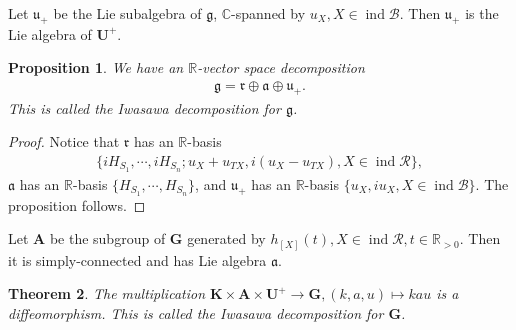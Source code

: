 \documentclass[12pt]{amsart}
\newtheorem{theorem}{Theorem}[section]
\newtheorem{proposition}[theorem]{Proposition}
\begin{document}
Let $\mathfrak{u}_+$ be the Lie subalgebra of $\mathfrak{g}$, $\mathbb{C}$-spanned by $u_X,X\in \operatorname{ind}\mathcal{B}$.
Then $\mathfrak{u}_+$ is the Lie algebra of $\mathbf{U}^+$.

\begin{proposition}
    We have an $\mathbb{R}$-vector space decomposition
    \begin{align*}
        \mathfrak{g}=\mathfrak{r}\oplus \mathfrak{a} \oplus \mathfrak{u}_+.
    \end{align*}
    This is called the Iwasawa decomposition for $\mathfrak{g}$.
\end{proposition}

\begin{proof}
    Notice that $\mathfrak{r}$ has an $\mathbb{R}$-basis
    \begin{align*}
         \{iH_{S_1},\cdots,iH_{S_n};u_X+u_{TX},i(u_X-u_{TX}),X\in \operatorname{ind}\mathcal{R}\},
    \end{align*}
    $\mathfrak{a}$ has an $\mathbb{R}$-basis $\{H_{S_1},\cdots,H_{S_n}\}$, and $\mathfrak{u}_+$ has an $\mathbb{R}$-basis $\{u_X,iu_X,X\in \operatorname{ind}\mathcal{B}\}$.
     The proposition follows.
\end{proof}

Let $\mathbf{A}$ be the subgroup of $\mathbf{G}$ generated by $h_{[X]}(t),X\in\operatorname{ind}\mathcal{R},t\in \mathbb{R}_{>0}$.
Then it is simply-connected and has Lie algebra $\mathfrak{a}$.

\begin{theorem}
    The multiplication $\mathbf{K}\times \mathbf{A}\times \mathbf{U}^+ \rightarrow \mathbf{G}, (k,a,u)\mapsto kau$ is a diffeomorphism.
    This is called the Iwasawa decomposition for $\mathbf{G}$.
\end{theorem}
\end{document}

